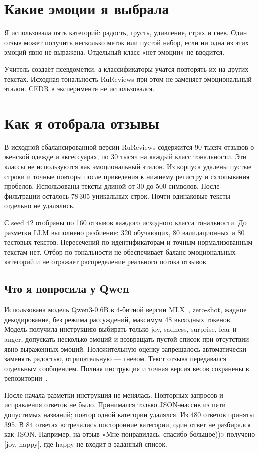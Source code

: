 \documentclass{misisarticle}
\begin{document}
\section{Какие эмоции я выбрала}
Я использовала пять категорий: радость, грусть, удивление, страх и гнев. Один отзыв может получить несколько меток или пустой набор, если ни одна из этих эмоций явно не выражена. Отдельный класс «нет эмоции» не вводится.

Учитель создаёт псевдометки, а классификаторы учатся повторять их на других текстах. Исходная тональность RuReviews при этом не заменяет эмоциональный эталон. CEDR в эксперименте не использовался.

\section{Как я отобрала отзывы}
В исходной сбалансированной версии RuReviews содержится 90 тысяч отзывов о женской одежде и аксессуарах, по 30 тысяч на каждый класс тональности. Эти классы не используются как эмоциональный эталон. Из корпуса удалены пустые строки и точные повторы после приведения к нижнему регистру и схлопывания пробелов. Использованы тексты длиной от 30 до 500 символов. После фильтрации осталось 78\,305 уникальных строк. Почти одинаковые тексты отдельно не удалялись.

С seed 42 отобраны по 160 отзывов каждого исходного класса тональности. До разметки LLM выполнено разбиение: 320 обучающих, 80 валидационных и 80 тестовых текстов. Пересечений по идентификаторам и точным нормализованным текстам нет. Отбор по тональности не обеспечивает баланс эмоциональных категорий и не отражает распределение реального потока отзывов.

\subsection{Что я попросила у Qwen}
Использована модель Qwen3-0.6B в 4-битной версии MLX~\cite{qwen,mlxqwen}, zero-shot, жадное декодирование, без режима рассуждений, максимум 48 выходных токенов. Модель получила инструкцию выбирать только joy, sadness, surprise, fear и anger, допускать несколько эмоций и возвращать пустой список при отсутствии явно выраженных эмоций. Положительную оценку запрещалось автоматически заменять радостью, отрицательную --- гневом. Текст отзыва передавался отдельным сообщением. Полная инструкция и точная версия весов сохранены в репозитории~\cite{code}.

После начала разметки инструкция не менялась. Повторных запросов и исправления ответов не было. Принимался только JSON-массив из пяти допустимых названий; повтор одной категории удалялся. Из 480 ответов приняты 395. В 84 ответах встречались посторонние категории, один ответ не разбирался как JSON. Например, на отзыв «Мне понравилась, спасибо большое))» получено [joy, happy], где happy не входит в заданный список.
\end{document}
